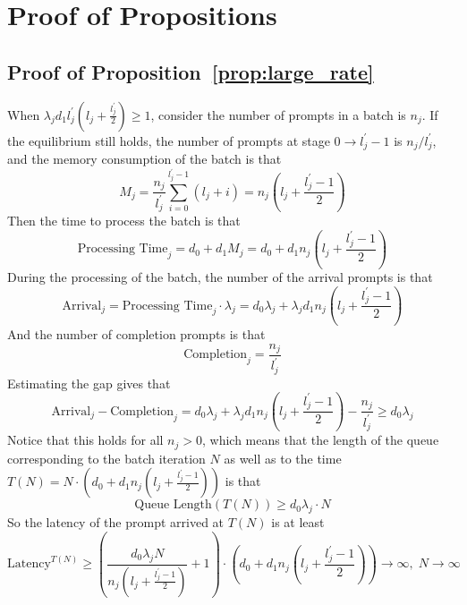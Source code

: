 \section{Proof of Propositions}

\subsection{Proof of Proposition~\ref{prop:large_rate}}\label{appendix::proof of fluid lower bound}
When $\lambda_jd_1l_j^{\prime}\left( l_j + \frac{l_j^\prime}{2} \right)\geq 1$, consider the number of prompts in a batch is $n_j$. If the equilibrium still holds, the number of prompts at stage $0 \to l_j^\prime-1$ is $n_j/l_j^\prime$, and the memory consumption of the batch is that
$$M_j = \frac{n_j}{l_j^\prime}\sum_{i=0}^{l_j^\prime-1}\left( l_j +i \right) = n_j \left(l_j + \frac{l_j^\prime-1}{2} \right)$$
Then the time to process the batch is that
$$\text{Processing Time}_j = d_0+d_1M_j=  
 d_0+d_1n_j \left(l_j + \frac{l_j^\prime-1}{2} \right)
$$
During the processing of the batch, the number of the arrival prompts is that
$$\text{Arrival}_j =\text{Processing Time}_j \cdot \lambda_j= 
 d_0\lambda_j+\lambda_jd_1n_j \left(l_j + \frac{l_j^\prime-1}{2} \right)$$
And the number of completion prompts is that
$$\text{Completion}_j = \frac{n_j}{l_j^\prime}$$
Estimating the gap gives that
$$\text{Arrival}_j - \text{Completion}_j  = d_0\lambda_j + \lambda_j d_1 n_j \left(l_j + \frac{l_j^\prime - 1}{2} \right) - \frac{n_j}{l_j^\prime} \geq d_0\lambda_j$$
Notice that this holds for all $n_j>0$, which means that the length of the queue corresponding to the batch iteration $N$ as well as to the time $T(N) = N \cdot \left(d_0+d_1n_j\left(l_j + \frac{l_j^\prime-1}{2}\right)\right)$ is that
$$\text{Queue Length}\left(T(N)\right) \geq d_0\lambda_j\cdot N$$
So the latency of the prompt arrived at $T(N)$ is at least 
$$\text{Latency}^{T(N)} \geq  \left(\frac{d_0\lambda_jN}{n_j\left(l_j + \frac{l_j^\prime-1}{2} \right)}+1\right)\cdot \left( 
 d_0+d_1n_j \left(l_j + \frac{l_j^\prime-1}{2} \right) \right)\to \infty,\;N\to \infty$$


